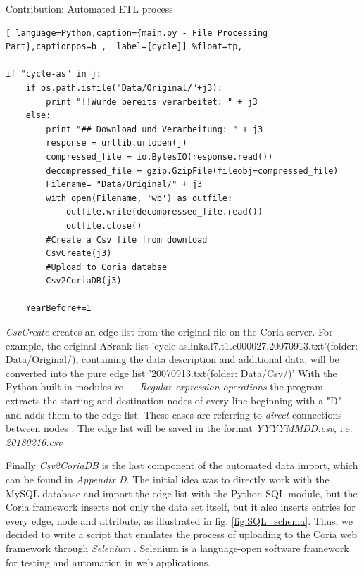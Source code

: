 \documentclass[conference, 11pt]{IEEEtran}
\begin{document}
\begin{subsection}{Contribution: Automated ETL process}
\vspace{0.5cm}
\begin{lstlisting}[ language=Python,caption={main.py - File Processing Part},captionpos=b ,  label={cycle}] %float=tp, 

if "cycle-as" in j:
	if os.path.isfile("Data/Original/"+j3):
		print "!!Wurde bereits verarbeitet: " + j3
	else:
		print "## Download und Verarbeitung: " + j3
		response = urllib.urlopen(j)
		compressed_file = io.BytesIO(response.read())
		decompressed_file = gzip.GzipFile(fileobj=compressed_file)
		Filename= "Data/Original/" + j3
		with open(Filename, 'wb') as outfile:
			outfile.write(decompressed_file.read())
			outfile.close()
		#Create a Csv file from download 
		CsvCreate(j3)
		#Upload to Coria databse 
		Csv2CoriaDB(j3)

	YearBefore+=1 
\end{lstlisting}
\vspace{0.5cm}

\textit{CsvCreate} creates an edge list from the original file on the Coria server.
For example, the original ASrank list 'cycle-aslinks.l7.t1.c000027.20070913.txt'(folder: Data/Original/), containing the data description and additional data, will be converted into the pure edge list '20070913.txt(folder: Data/Csv/)' With the Python built-in modules \textit{re — Regular expression operations} 
the program extracts the starting and destination nodes of every line beginning with a "D" and adds them to the edge list. These cases are referring to \textit{direct} connections between nodes \cite{IPv4Data}. The edge list will be saved in the format \textit{YYYYMMDD.csv}, i.e. \textit{20180216.csv} \\



\vspace{0.3cm}
 \vspace{0.5cm}



Finally \textit{Csv2CoriaDB} is the last component of the automated data import, which can be found in \textit{Appendix D}. The initial idea was to directly work with the MySQL database and import the edge list with the Python SQL module, but the Coria framework inserts not only the data set itself, but it also inserts entries for every edge, node and attribute, as illustrated in fig. \ref{fig:SQL_schema}. Thus, we decided to write a script that emulates the process of uploading to the Coria web framework through \textit{Selenium} \cite{selenium}. Selenium is a language-open software framework for testing and automation in web applications. \\ \linebreak


\end{subsection}
\end{document}
